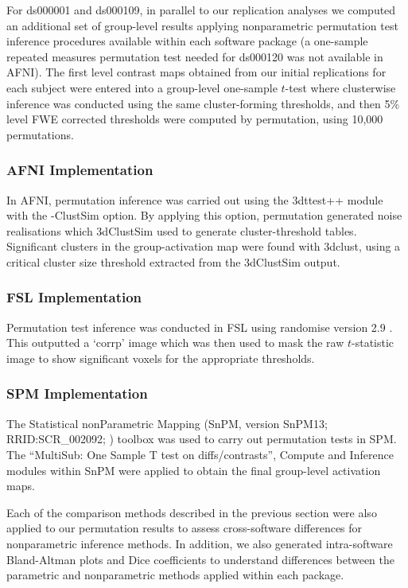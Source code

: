 For ds000001 and ds000109, in parallel to our replication analyses we computed an additional set of group-level results applying nonparametric permutation test inference procedures available within each software package (a one-sample repeated measures permutation test needed for ds000120 was not available in AFNI). The first level contrast maps obtained from our initial replications for each subject were entered into a group-level one-sample $t$-test where clusterwise inference was conducted using the same cluster-forming thresholds, and then 5\% level FWE corrected thresholds were computed by permutation, using 10,000 permutations.

\subsubsection{AFNI Implementation}
In AFNI, permutation inference was carried out using the 3dttest++ module with the -ClustSim option. By applying this option, permutation generated noise realisations which 3dClustSim used to generate cluster-threshold tables. Significant clusters in the group-activation map were found with 3dclust, using a critical cluster size threshold extracted from the 3dClustSim output. 

\subsubsection{FSL Implementation}
Permutation test inference was conducted in FSL using randomise version 2.9 \citep{Winkler2016-mw}. This outputted a `corrp' image which was then used to mask the raw $t$-statistic image to show significant voxels for the appropriate thresholds. 

\subsubsection{SPM Implementation}
The Statistical nonParametric Mapping (SnPM, version SnPM13; RRID:SCR\_002092; \citep{Nichols2002-kf}) toolbox was used to carry out permutation tests in SPM. The ``MultiSub: One Sample T test on diffs/contrasts'', Compute and Inference modules within SnPM were applied to obtain the final group-level activation maps.

Each of the comparison methods described in the previous section were also applied to our permutation results to assess cross-software differences for nonparametric inference methods. In addition, we also generated intra-software Bland-Altman plots and Dice coefficients to understand differences between the parametric and nonparametric methods applied within each package. 

